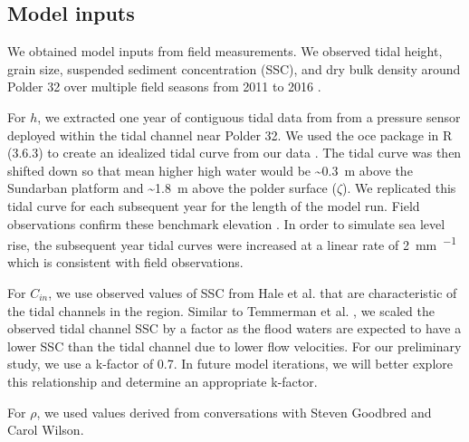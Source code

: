 \documentclass[9pt,twocolumn,twoside,lineno]{pnas-new}
\begin{document}
\subsection*{Model inputs}

We obtained model inputs from field measurements. We observed tidal height, grain size, suspended sediment concentration (SSC), and dry bulk density around Polder 32 over multiple field seasons from 2011 to 2016 \cite{auerbach_flood_2015,hale_observations_2019,hale_seasonal_2019}.

For $h$, we extracted one year of contiguous tidal data from from a pressure sensor deployed within the tidal channel near Polder 32. We used the oce package in R (3.6.3) to create an idealized tidal curve from our data \cite{kelley_oce_2020}. The tidal curve was then shifted down so that mean higher high water would be \SI{~0.3}{\meter} above the Sundarban platform and \SI{~1.8}{\meter} above the polder surface ($\zeta$). We replicated this tidal curve for each subsequent year for the length of the model run. Field observations confirm these benchmark elevation \cite{auerbach_flood_2015,hale_observations_2019,hale_seasonal_2019,bomer_surface_2020}. In order to simulate sea level rise, the subsequent year tidal curves were increased at a linear rate of \SI{2}{\milli\meter\per\year} which is consistent with field observations.


For $C_{in}$, we use observed values of SSC from Hale et al. \cite{hale_observations_2019} that are characteristic of the tidal channels in the region. Similar to Temmerman et al. \cite{temmerman_modelling_2003,temmerman_modelling_2004}, we scaled the observed tidal channel SSC by a factor as the flood waters are expected to have a lower SSC than the tidal channel due to lower flow velocities. For our preliminary study, we use a k-factor of 0.7. In future model iterations, we will better explore this relationship and determine an appropriate k-factor.

For $\rho$, we used values derived from conversations with Steven Goodbred and Carol Wilson.


\showmatmethods{} %


\showacknow{} %



\end{document}
